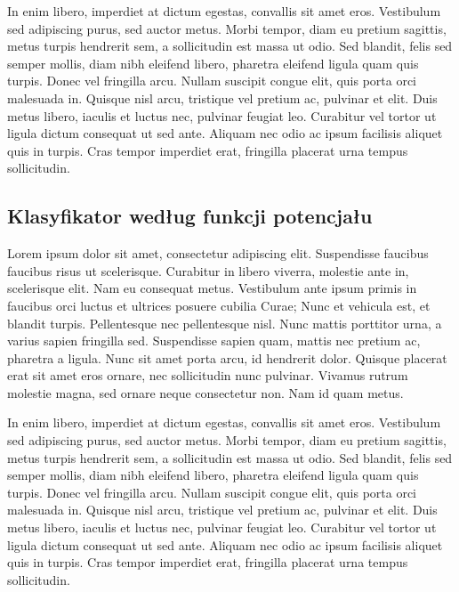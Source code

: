 In enim libero, imperdiet at dictum egestas, convallis sit amet eros. Vestibulum sed adipiscing purus, sed auctor metus. Morbi tempor, diam eu pretium sagittis, metus turpis hendrerit sem, a sollicitudin est massa ut odio. Sed blandit, felis sed semper mollis, diam nibh eleifend libero, pharetra eleifend ligula quam quis turpis. Donec vel fringilla arcu. Nullam suscipit congue elit, quis porta orci malesuada in. Quisque nisl arcu, tristique vel pretium ac, pulvinar et elit. Duis metus libero, iaculis et luctus nec, pulvinar feugiat leo. Curabitur vel tortor ut ligula dictum consequat ut sed ante. Aliquam nec odio ac ipsum facilisis aliquet quis in turpis. Cras tempor imperdiet erat, fringilla placerat urna tempus sollicitudin.

	\subsection{Klasyfikator według funkcji potencjału}
	Lorem ipsum dolor sit amet, consectetur adipiscing elit. Suspendisse faucibus faucibus risus ut scelerisque. Curabitur in libero viverra, molestie ante in, scelerisque elit. Nam eu consequat metus. Vestibulum ante ipsum primis in faucibus orci luctus et ultrices posuere cubilia Curae; Nunc et vehicula est, et blandit turpis. Pellentesque nec pellentesque nisl. Nunc mattis porttitor urna, a varius sapien fringilla sed. Suspendisse sapien quam, mattis nec pretium ac, pharetra a ligula. Nunc sit amet porta arcu, id hendrerit dolor. Quisque placerat erat sit amet eros ornare, nec sollicitudin nunc pulvinar. Vivamus rutrum molestie magna, sed ornare neque consectetur non. Nam id quam metus.

	In enim libero, imperdiet at dictum egestas, convallis sit amet eros. Vestibulum sed adipiscing purus, sed auctor metus. Morbi tempor, diam eu pretium sagittis, metus turpis hendrerit sem, a sollicitudin est massa ut odio. Sed blandit, felis sed semper mollis, diam nibh eleifend libero, pharetra eleifend ligula quam quis turpis. Donec vel fringilla arcu. Nullam suscipit congue elit, quis porta orci malesuada in. Quisque nisl arcu, tristique vel pretium ac, pulvinar et elit. Duis metus libero, iaculis et luctus nec, pulvinar feugiat leo. Curabitur vel tortor ut ligula dictum consequat ut sed ante. Aliquam nec odio ac ipsum facilisis aliquet quis in turpis. Cras tempor imperdiet erat, fringilla placerat urna tempus sollicitudin.
	
